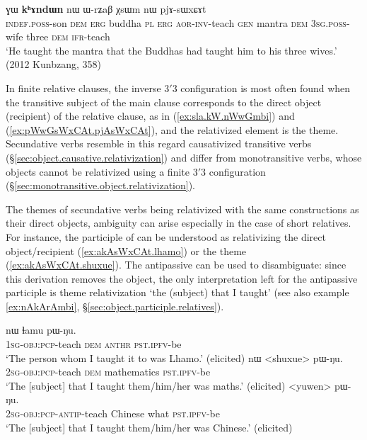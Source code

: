  
\begin{exe}
\ex \label{ex:pWwGsWxCAt.pjAsWxCAt}
 ɣɯ \textbf{kʰɤndɯn} nɯ ɯ-rʑaβ χsɯm nɯ pjɤ-sɯxɕɤt \\
\textsc{indef}.\textsc{poss}-son \textsc{dem} \textsc{erg} buddha \textsc{pl} \textsc{erg} \textsc{aor}-\textsc{inv}-teach \textsc{gen} mantra \textsc{dem} \textsc{3sg}.\textsc{poss}-wife three \textsc{dem} \textsc{ifr}-teach \\
\glt `He taught the mantra that the Buddhas had taught him to his three wives.' (2012 Kunbzang, 358)
\end{exe} 

In finite relative clauses, the inverse 3$'$\fl{}3 configuration is most often found when the transitive subject of the main clause corresponds to the direct object (recipient) of the relative clause, as in (\ref{ex:sla.kW.nWwGmbi}) and (\ref{ex:pWwGsWxCAt.pjAsWxCAt}), and the relativized element is the theme. Secundative verbs resemble in this regard causativized transitive verbs (§\ref{sec:object.causative.relativization}) and differ from monotransitive verbs, whose objects cannot be relativized using a finite  3$'$\fl{}3 configuration (§\ref{sec:monotransitive.object.relativization}).

The themes of secundative verbs being relativized with the same constructions as their direct objects, ambiguity can arise especially in the case of short relatives. For instance, the participle  of  can be understood as relativizing the direct object/recipient (\ref{ex:akAsWxCAt.lhamo}) or the theme (\ref{ex:akAsWxCAt.shuxue}). The antipassive can be used to disambiguate: since this derivation removes the object, the only interpretation left for the antipassive participle  is theme relativization `the (subject) that I taught' (see also example \ref{ex:nAkArAmbi}, §\ref{sec:object.participle.relatives}).

\begin{exe}
\ex 
\begin{xlist}
\ex \label{ex:akAsWxCAt.lhamo}
\gll  [a-kɤ-sɯxɕɤt] nɯ ɬamu pɯ-ŋu. \\
\textsc{1sg}-\textsc{obj}:\textsc{pcp}-teach \textsc{dem}  \textsc{anthr} \textsc{pst}.\textsc{ipfv}-be \\
\glt `The person whom I taught it to was Lhamo.' (elicited)
\ex \label{ex:akAsWxCAt.shuxue}
\gll  [a-kɤ-sɯxɕɤt] nɯ  <shuxue> pɯ-ŋu. \\
\textsc{2sg}-\textsc{obj}:\textsc{pcp}-teach \textsc{dem} mathematics \textsc{pst}.\textsc{ipfv}-be \\
\glt `The [subject] that I taught them/him/her was maths.' (elicited)
\ex \label{ex:akAsAsWxCAt}
\gll [a-kɤ-sɤ-sɯxɕɤt] <yuwen>  pɯ-ŋu. \\
\textsc{2sg}-\textsc{obj}:\textsc{pcp}-\textsc{antip}-teach Chinese what \textsc{pst}.\textsc{ipfv}-be \\
\glt `The [subject] that I taught them/him/her was Chinese.' (elicited)
\end{xlist} 
\end{exe} 

